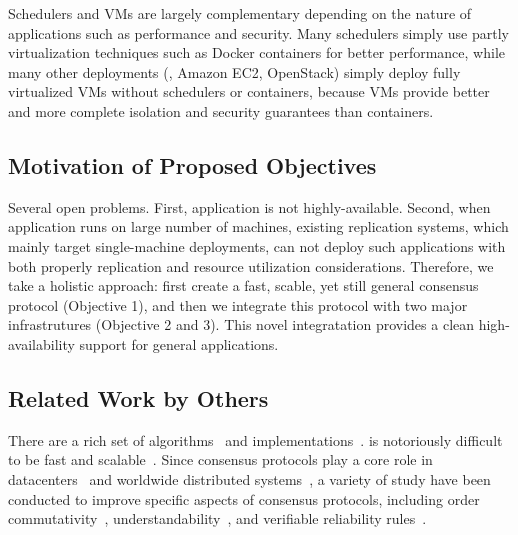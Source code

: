 Schedulers and VMs are largely complementary depending on the nature of 
applications such as performance and security. Many schedulers simply use 
partly virtualization techniques such as Docker containers for better 
performance, while many other deployments (\eg, Amazon EC2, OpenStack) simply 
deploy fully virtualized VMs without schedulers or containers, because VMs 
provide better and more complete isolation and security guarantees than 
containers.


\vspace{-.15in}\subsection{Motivation of Proposed Objectives} 
\label{sec:motivation}\vspace{-.075in}

Several open problems. First, application is not highly-available. Second, when 
application runs on large number of machines, existing replication systems, 
which mainly target single-machine deployments, can not deploy such 
applications with both properly replication and resource utilization 
considerations. Therefore, we take a holistic approach: first create a fast, 
scable, yet still general consensus protocol (Objective 1), and then we 
integrate this protocol with two major infrastrutures (Objective 2 and 3). This 
novel integratation provides a clean high-availability support for general  
applications.

\vspace{-.15in}\subsection{Related Work by Others} 
 \label{sec:others-work}\vspace{-.075in} 
There are a rich set of
\paxos algorithms~\cite{paxos:practical,paxos,paxos:simple,paxos:complex,
epaxos:sosp13} and 
implementations~\cite{paxos:live,paxos:practical,chubby:osdi,crane:sosp15}. 
\paxos is notoriously difficult to be fast and 
scalable~\cite{ellis:thesis,manos:hotdep10,scatter:sosp11}. Since consensus 
protocols play a core role in datacenters~\cite{matei:hotcloud11, mesos:nsdi11, 
datacenter:os} and worldwide 
distributed systems~\cite{spanner:osdi12,mencius:osdi08}, a variety of study 
have been conducted to improve specific aspects of consensus protocols, 
including order commutativity~\cite{epaxos:sosp13}, 
understandability~\cite{raft:usenix14,paxos}, and verifiable reliability 
rules~\cite{modist:nsdi09,demeter:sosp11}.

